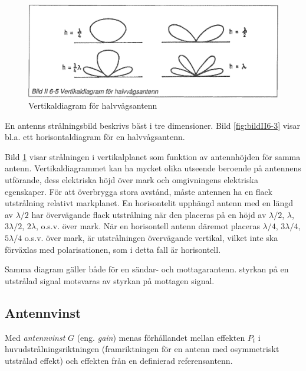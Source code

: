 \begin{figure}
  \includegraphics[width=\textwidth]{images/bild_2_6-05}
  \caption{Vertikaldiagram för halvvågsantenn}
  \label{fig:bildII6-5}
\end{figure}

En antenns strålningsbild beskrivs bäst i tre dimensioner. Bild \ref{fig:bildII6-3}
visar bl.a. ett horisontaldiagram för en halvvågsantenn.

Bild \ref{fig:bildII6-5} visar strålningen i vertikalplanet som funktion av
antennhöjden för samma antenn. Vertikaldiagrammet kan ha mycket olika
utseende beroende på antennens utförande, dess elektriska höjd över
mark och omgivningens elektriska egenskaper. För att överbrygga stora
avstånd, måste antennen ha en flack utstrålning relativt
markplanet. En horisontelit upphängd antenn med en längd av
\(\lambda/2\) har övervägande flack utstrålning när den placeras på en
höjd av \(\lambda/2\), \(\lambda\), \(3\lambda/2\), \(2\lambda\),
o.s.v. över mark. När en horisontell antenn däremot placeras
\(\lambda/4\), \(3\lambda/4\), \(5\lambda/4\) o.s.v. över mark, är
utstrålningen övervägande vertikal, vilket inte ska förväxlas med
polarisationen, som i detta fall är horisontell.

Samma diagram gäller både för en sändar- och mottagarantenn. styrkan
på en utstrålad signal motsvaras av styrkan på mottagen signal.

\subsection{Antennvinst}

Med \emph{antennvinst} \(G\) (eng. \emph{gain}) menas förhållandet mellan effekten
\(P_t\) i huvudstrålningsriktningen (framriktningen för en antenn med
osymmetriskt utstrålad effekt) och effekten från en definierad
referensantenn.

